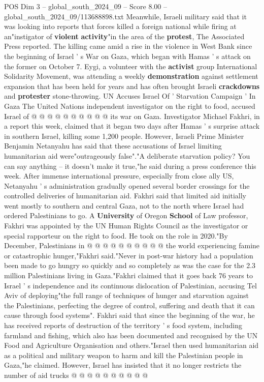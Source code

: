 \begin{textsample}{POS Dim 3 – global\_south\_2024\_09 – Score 8.00 – global\_south\_2024\_09/113688898.txt}
Meanwhile, Israeli military said that it was looking into reports that forces killed a foreign national while firing at an"instigator of \textbf{violent} \textbf{activity}"in the area of the \textbf{protest}, The Associated Press reported.
The killing came amid a rise in the violence in West Bank since the beginning of Israel ' s War on Gaza, which began with Hamas ' s attack on the former on October 7.
Eygi, a volunteer with the \textbf{activist} group International Solidarity Movement, was attending a weekly \textbf{demonstration} against settlement expansion that has been held for years and has often brought Israeli \textbf{crackdowns} and \textbf{protester} stone-throwing.
UN Accuses Israel Of ' Starvation Campaign ' In Gaza The United Nations independent investigator on the right to food, accused Israel of @ @ @ @ @ @ @ @ @ @ its war on Gaza.
Investigator Michael Fakhri, in a report this week, claimed that it began two days after Hamas ' s surprise attack in southern Israel, killing some 1,200 people.
However, Israeli Prime Minister Benjamin Netanyahu has said that these accusations of Israel limiting humanitarian aid were"outrageously false"."A deliberate starvation policy?
You can say anything -- it doesn't make it true,"he said during a press conference this week.
After immense international pressure, especially from close ally US, Netanyahu ' s administration gradually opened several border crossings for the controlled deliveries of humanitarian aid.
Fakhri said that limited aid initially went mostly to southern and central Gaza, not to the north where Israel had ordered Palestinians to go.
A \textbf{University} of Oregon \textbf{School} of Law professor, Fakhri was appointed by the UN Human Rights Council as the investigator or special rapporteur on the right to food.
He took on the role in 2020."By December, Palestinians in @ @ @ @ @ @ @ @ @ @ the world experiencing famine or catastrophic hunger,"Fakhri said."Never in post-war history had a population been made to go hungry so quickly and so completely as was the case for the 2.3 million Palestinians living in Gaza."Fakhri claimed that it goes back 76 years to Israel ' s independence and its continuous dislocation of Palestinian, accusing Tel Aviv of deploying"the full range of techniques of hunger and starvation against the Palestinians, perfecting the degree of control, suffering and death that it can cause through food systems".
Fakhri said that since the beginning of the war, he has received reports of destruction of the territory ' s food system, including farmland and fishing, which also has been documented and recognised by the UN Food and Agriculture Organisation and others."Israel then used humanitarian aid as a political and military weapon to harm and kill the Palestinian people in Gaza,"he claimed.
However, Israel has insisted that it no longer restricts the number of aid trucks @ @ @ @ @ @ @ @ @ @

\end{textsample}
